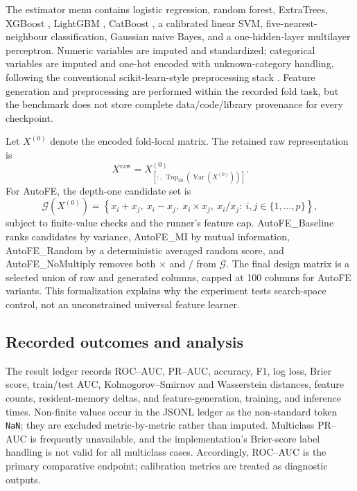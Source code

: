\documentclass[preprint,12pt]{elsarticle}
\begin{document}
The estimator menu contains logistic regression, random forest, ExtraTrees, XGBoost \citep{chen2016}, LightGBM \citep{ke2017}, CatBoost \citep{prokhorenkova2018}, a calibrated linear SVM, five-nearest-neighbour classification, Gaussian naive Bayes, and a one-hidden-layer multilayer perceptron.  Numeric variables are imputed and standardized; categorical variables are imputed and one-hot encoded with unknown-category handling, following the conventional scikit-learn-style preprocessing stack \citep{pedregosa2011}.  Feature generation and preprocessing are performed within the recorded fold task, but the benchmark does not store complete data/code/library provenance for every checkpoint.

Let $X^{(0)}$ denote the encoded fold-local matrix.  The retained raw representation is
\begin{equation}
  X^{\mathrm{raw}}=X^{(0)}_{[:,\,\operatorname{Top}_{20}(\operatorname{Var}(X^{(0)}))]}.
\end{equation}
For AutoFE, the depth-one candidate set is
\begin{equation}
  \mathcal{G}(X^{(0)})=\left\{x_i+x_j,\ x_i-x_j,\ x_i\times x_j,\ x_i/x_j:\ i,j\in\{1,\ldots,p\}\right\},
\end{equation}
subject to finite-value checks and the runner’s feature cap.  AutoFE\_Baseline ranks candidates by variance, AutoFE\_MI by mutual information, AutoFE\_Random by a deterministic averaged random score, and AutoFE\_NoMultiply removes both $\times$ and $/$ from $\mathcal{G}$.  The final design matrix is a selected union of raw and generated columns, capped at 100 columns for AutoFE variants.  This formalization explains why the experiment tests search-space control, not an unconstrained universal feature learner.

\subsection{Recorded outcomes and analysis}
The result ledger records ROC--AUC, PR--AUC, accuracy, F1, log loss, Brier score, train/test AUC, Kolmogorov--Smirnov and Wasserstein distances, feature counts, resident-memory deltas, and feature-generation, training, and inference times.  Non-finite values occur in the JSONL ledger as the non-standard token \texttt{NaN}; they are excluded metric-by-metric rather than imputed.  Multiclass PR--AUC is frequently unavailable, and the implementation’s Brier-score label handling is not valid for all multiclass cases.  Accordingly, ROC--AUC is the primary comparative endpoint; calibration metrics are treated as diagnostic outputs.
\end{document}

